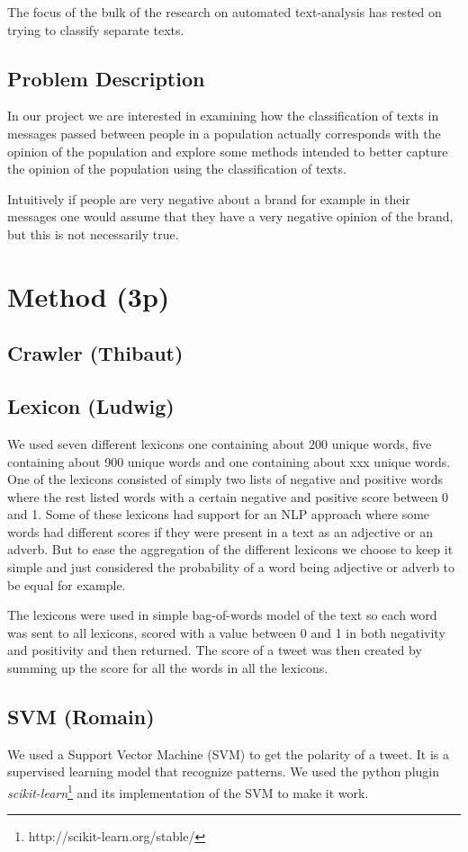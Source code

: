 \documentclass[a4paper,11pt]{report}
\begin{document}
The focus of the bulk of the research on automated text-analysis has rested on trying to classify separate texts.

\section{Problem Description}
In our project we are interested in examining how the classification of texts in messages passed between people in a population actually corresponds with the opinion of the population and explore some methods intended to better capture the opinion of the population using the classification of texts. 

Intuitively if people are very negative about a brand for example in their messages one would assume that they have a very negative opinion of the brand, but this is not necessarily true. 

\chapter{Method (3p)}

\section{Crawler (Thibaut)}

\section{Lexicon (Ludwig)}
We used seven different lexicons one containing about 200 unique words, five containing about 900 unique words and one containing about xxx unique words.
One of the lexicons consisted of simply two lists of negative and positive words where the rest listed words with a certain negative and positive score between 0 and 1. 
Some of these lexicons had support for an NLP approach where some words had different scores if they were present in a text as an adjective or an adverb.  
But to ease the aggregation of the different lexicons we choose to keep it simple and just considered the probability of a word being adjective or adverb to be equal for example.

The lexicons were used in simple bag-of-words model of the text so each word was sent to all lexicons, scored with a value between 0 and 1 in both negativity and positivity and then returned. 
The score of a tweet was then created by summing up the score for all the words in all the lexicons. 

\section{SVM (Romain)}
We used a Support Vector Machine (SVM) to get the polarity of a tweet. It is a supervised learning model that recognize patterns. We used the python plugin \textit{scikit-learn}\footnote{http://scikit-learn.org/stable/} and its implementation of the SVM to make it work.
\end{document}
